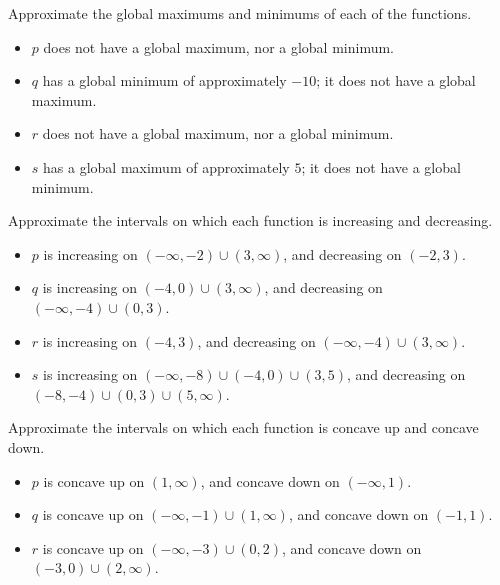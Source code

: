 \begin{exercises}
\begin{problem}
\begin{subproblem}
\begin{shortsolution}
 	\end{shortsolution}
 \end{subproblem}
 \begin{subproblem}
 	Approximate the global maximums and minimums of each of the functions.
 	\begin{shortsolution}
 		\begin{itemize}
 			\item $p$ does not have a global maximum, nor a global minimum.
 			\item $q$ has a global minimum of approximately $-10$; it does not have a global maximum.
 			\item $r$ does not have a global maximum, nor a global minimum.
 			\item $s$ has a global maximum of approximately $5$; it does not have a global minimum.
 		\end{itemize}
 	\end{shortsolution}
 \end{subproblem}
 \begin{subproblem}
 	Approximate the intervals on which each function is increasing and decreasing.
 	\begin{shortsolution}
 		\begin{itemize}
 			\item $p$ is increasing on $(-\infty,-2)\cup (3,\infty)$, and decreasing on $(-2,3)$.
 			\item $q$ is increasing on $(-4,0)\cup (3,\infty)$, and decreasing on $(-\infty,-4)\cup (0,3)$.
 			\item $r$ is increasing on $(-4,3)$, and decreasing on $(-\infty,-4)\cup (3,\infty)$.
 			\item $s$ is increasing on $(-\infty,-8)\cup (-4,0)\cup (3,5)$, and decreasing on $(-8,-4)\cup (0,3)\cup (5,\infty)$.
 		\end{itemize}
 	\end{shortsolution}
 \end{subproblem}
 \begin{subproblem}
 	Approximate the intervals on which each function is concave up and concave down.
 	\begin{shortsolution}
 		\begin{itemize}
 			\item $p$ is concave up on  $(1,\infty)$, and concave down on  $(-\infty,1)$.
 			\item $q$ is concave up on $(-\infty,-1)\cup (1,\infty)$, and concave down on $(-1,1)$.
 			\item $r$ is concave up on $(-\infty,-3)\cup (0,2)$, and concave down on $(-3,0)\cup (2,\infty)$.

\end{itemize}
\end{shortsolution}
\end{subproblem}
\end{problem}
\end{exercises}
